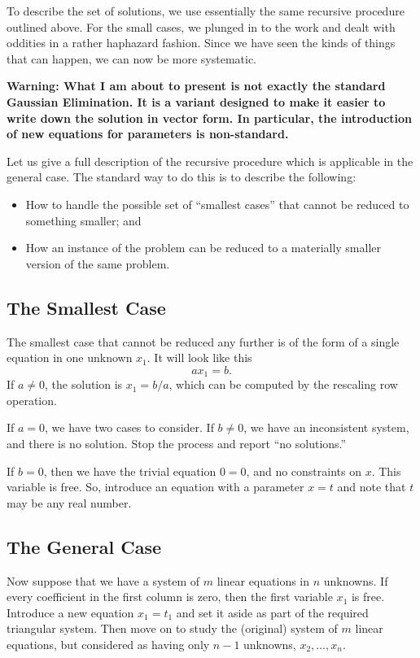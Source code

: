 \documentclass[00-livre-main.tex]{subfiles}
\begin{document}
To describe the set of solutions, we use essentially the same recursive procedure outlined above. For the small cases, we plunged in to the work and dealt with oddities in a rather haphazard fashion. Since we have seen the kinds of things that can happen, we can now be more systematic.

\textbf{Warning: What I am about to present is not exactly the standard Gaussian Elimination. It is a variant designed to make it easier to write down the solution in vector form. In particular, the introduction of new equations for parameters is non-standard.}

Let us give a full description of the recursive procedure which is applicable in the general case. The standard way to do this is to describe the following:
\begin{itemize}
\item How to handle the possible set of ``smallest cases'' that cannot be reduced to something smaller; and
\item How an instance of the problem can be reduced to a materially smaller version of the same problem.
\end{itemize}

\subsection*{The Smallest Case}

The smallest case that cannot be reduced any further is of the form of a single equation in one unknown $x_1$. It will look like this
\[
a x_1  = b.
\]
If $a\neq 0$, the solution is $x_1= b/a$, which can be computed by the rescaling row operation.

If $a=0$, we have two cases to consider. If $b\neq0$, we have an inconsistent system, and there is no solution. Stop the process and report ``no solutions.'' 

If $b = 0$, then we have the trivial equation $0=0$, and no constraints on $x$. This variable is free. So, introduce an equation with a parameter $x=t$ and note that $t$ may be any real number.

\subsection*{The General Case}

Now suppose that we have a system of $m$ linear equations in $n$ unknowns. If every coefficient in the first column is zero, then the first variable $x_1$ is free. Introduce a new equation $x_1 = t_1$ and set it aside as part of the required triangular system. Then move on to study the (original) system of $m$ linear equations, but considered as having only $n-1$ unknowns, $x_2, \ldots, x_n$.
\end{document}
